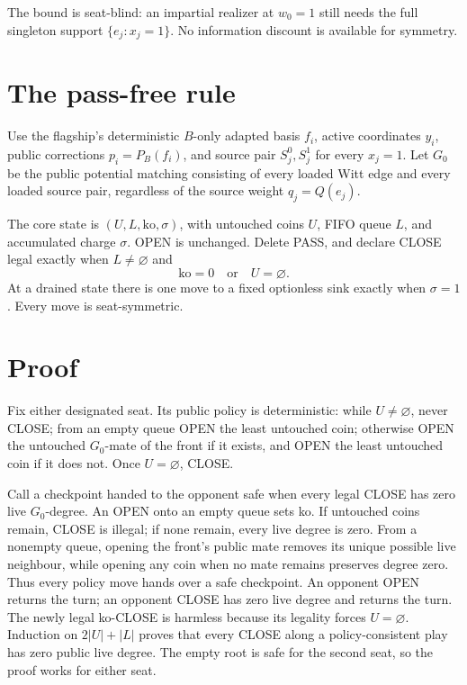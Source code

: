 \documentclass[11pt]{article}
\theoremstyle{definition}
\theoremstyle{remark}
\begin{document}
The bound is seat-blind: an impartial realizer at $w_0=1$ still needs the
full singleton support $\{e_j : x_j=1\}$.  No information discount is
available for symmetry.

\section{The pass-free rule}

Use the flagship's deterministic $B$-only adapted basis $f_i$, active
coordinates $y_i$, public corrections $p_i=P_B(f_i)$, and source pair
$S_j^0,S_j^1$ for every $x_j=1$.  Let $G_0$ be the public potential
matching consisting of every loaded Witt edge and every loaded source pair,
regardless of the source weight $q_j=Q(e_j)$.

The core state is $(U,L,\mathrm{ko},\sigma)$, with untouched coins $U$, FIFO
queue $L$, and accumulated charge $\sigma$.  OPEN is unchanged.  Delete
PASS, and declare CLOSE legal exactly when $L\ne\varnothing$ and
\[
  \mathrm{ko}=0\quad\text{or}\quad U=\varnothing.
\]
At a drained state there is one move to a fixed optionless sink exactly when
$\sigma=1$.  Every move is seat-symmetric.

\section{Proof}

Fix either designated seat.  Its public policy is deterministic: while
$U\ne\varnothing$, never CLOSE; from an empty queue OPEN the least untouched
coin; otherwise OPEN the untouched $G_0$-mate of the front if it exists, and
OPEN the least untouched coin if it does not.  Once $U=\varnothing$, CLOSE.

Call a checkpoint handed to the opponent safe when every legal CLOSE has
zero live $G_0$-degree.  An OPEN onto an empty queue sets ko.  If untouched
coins remain, CLOSE is illegal; if none remain, every live degree is zero.
From a nonempty queue, opening the front's public mate removes its unique
possible live neighbour, while opening any coin when no mate remains
preserves degree zero.  Thus every policy move hands over a safe checkpoint.
An opponent OPEN returns the turn; an opponent CLOSE has zero live degree
and returns the turn.  The newly legal ko-CLOSE is harmless because its
legality forces $U=\varnothing$.  Induction on $2|U|+|L|$ proves that every
CLOSE along a policy-consistent play has zero public live degree.  The empty
root is safe for the second seat, so the proof works for either seat.
\end{document}

